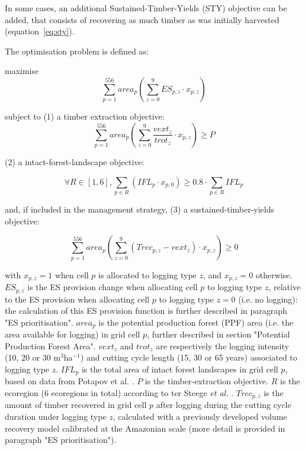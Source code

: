 \documentclass[12pt]{article}
\begin{document}
In some cases, an additional Sustained-Timber-Yields (STY) objective can be added, that consists of recovering as much timber as was initially harvested (equation~\ref{eq:sty}). 

The optimisation problem is defined as: 

maximise
\begin{equation}
\sum_{p=1}^{556} area_{p} \left( \sum_{z=0}^{9} ES_{p,z} \cdot x_{p,z} \right) 
\end{equation}

subject to (1) a timber extraction objective:
\begin{equation}
\sum_{p=1}^{556} area_{p} \left( \sum_{z=0}^{9}\frac{ vext_{z} }{ trot_{z}} \cdot x_{p,z} \right)  \geq P
\end{equation}

(2) a intact-forest-landscape objective: 

\begin{equation}
\label{eq:ifl}
\forall R \in [1,6], \sum_{p\in R} (IFL_p \cdot x_{p,0}) \geq 0.8 \cdot \sum_{p\in R} IFL_p 
\end{equation}

and, if included in the management strategy, (3) a sustained-timber-yields objective: 

\begin{equation}
\label{eq:sty}
\sum_{p=1}^{556} area_{p} \left( \sum_{z=0}^{9}  ( Trec_{p,z} - vext_{z} )\cdot x_{p,z}   \right) \geq 0
\end{equation}

with $x_{p,z} = 1$ when cell $p$ is allocated to logging type $z$, and $x_{p,z} = 0$ otherwise. $ES_{p,z}$ is the ES provision change when allocating cell $p$ to logging type $z$, relative to the ES provision when allocating cell $p$ to logging type $z=0$ (i.e. no logging): the calculation of this ES provision function is further described in paragraph "ES prioritisation". $area_{p}$ is the potential production forest (PPF) area (i.e. the area available for logging) in grid cell $p$, further described in section "Potential Production Forest Area". $vext_{z}$ and $trot_{z}$ are respectively the logging intensity (10, 20 or 30 m$^3$ha$^{-1}$) and cutting cycle length (15, 30 or 65 years) associated to logging type $z$. $IFL_p$ is the total area of intact forest landscapes in grid cell $p$, based on data from Potapov et al. \cite{Potapov2017}. $P$ is the timber-extraction objective. $R$ is the ecoregion (6 ecoregions in total) according to ter Steege \textit{et al.} \cite{TerSteege2013}. $Trec_{p,z}$ is the amount of timber recovered in grid cell $p$ after logging during the cutting cycle duration under logging type $z$, calculated with a previously developed volume recovery model calibrated at the Amazonian scale \cite{Piponiot2019} (more detail is provided in paragraph "ES prioritisation"). 
\end{document}
